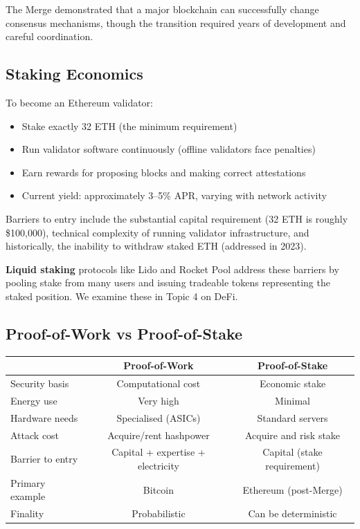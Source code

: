 \documentclass[11pt,a4paper]{article}
\newcommand{\keyword}[1]{\textbf{\textcolor{AccentOrange}{#1}}}
\begin{document}
The Merge demonstrated that a major blockchain can successfully change consensus mechanisms, though the transition required years of development and careful coordination.

\subsection{Staking Economics}

To become an Ethereum validator:
\begin{itemize}
    \item Stake exactly 32 ETH (the minimum requirement)
    \item Run validator software continuously (offline validators face penalties)
    \item Earn rewards for proposing blocks and making correct attestations
    \item Current yield: approximately 3--5\% APR, varying with network activity
\end{itemize}

Barriers to entry include the substantial capital requirement (32 ETH is roughly \$100,000), technical complexity of running validator infrastructure, and historically, the inability to withdraw staked ETH (addressed in 2023).

\keyword{Liquid staking} protocols like Lido and Rocket Pool address these barriers by pooling stake from many users and issuing tradeable tokens representing the staked position. We examine these in Topic 4 on DeFi.

\subsection{Proof-of-Work vs Proof-of-Stake}

\begin{center}
\begin{tabular}{lcc}
\toprule
& \textbf{Proof-of-Work} & \textbf{Proof-of-Stake} \\
\midrule
Security basis & Computational cost & Economic stake \\
Energy use & Very high & Minimal \\
Hardware needs & Specialised (ASICs) & Standard servers \\
Attack cost & Acquire/rent hashpower & Acquire and risk stake \\
Barrier to entry & Capital + expertise + electricity & Capital (stake requirement) \\
Primary example & Bitcoin & Ethereum (post-Merge) \\
Finality & Probabilistic & Can be deterministic \\
\bottomrule
\end{tabular}
\end{center}
\end{document}
